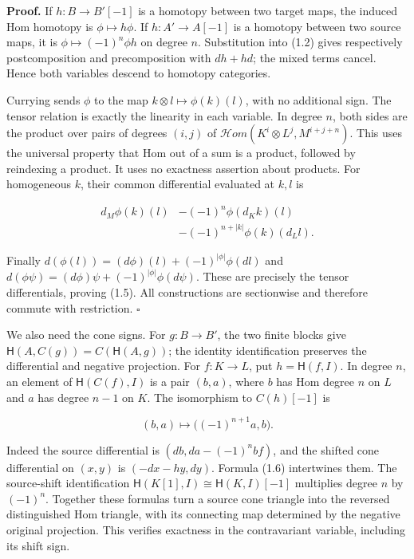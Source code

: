 \documentclass[
  english,
  11pt,
  a4paper,
]{article}
\begin{document}
\textbf{Proof.} If \(h:B\to B'[-1]\) is a homotopy between two target
maps, the induced Hom homotopy is \(\phi\mapsto h\phi\). If
\(h:A'\to A[-1]\) is a homotopy between two source maps, it is
\(\phi\mapsto(-1)^n\phi h\) on degree \(n\). Substitution into (1.2)
gives respectively postcomposition and precomposition with \(dh+hd\);
the mixed terms cancel. Hence both variables descend to homotopy
categories.

Currying sends \(\phi\) to the map \(k\otimes l\mapsto\phi(k)(l)\), with
no additional sign. The tensor relation is exactly the linearity in each
variable. In degree \(n\), both sides are the product over pairs of
degrees \((i,j)\) of \(\mathcal Hom(K^i\otimes L^j,M^{i+j+n})\). This
uses the universal property that Hom out of a sum is a product, followed
by reindexing a product. It uses no exactness assertion about products.
For homogeneous \(k\), their common differential evaluated at \(k,l\) is

\[\begin{aligned}
d_M\phi(k)(l)&-(-1)^n\phi(d_Kk)(l)\\
&-(-1)^{n+|k|}\phi(k)(d_Ll).
\end{aligned}\]

Finally \(d(\phi(l))=(d\phi)(l)+(-1)^{|\phi|}\phi(dl)\) and
\(d(\phi\psi)=(d\phi)\psi+(-1)^{|\phi|}\phi(d\psi)\). These are
precisely the tensor differentials, proving (1.5). All constructions are
sectionwise and therefore commute with restriction. \(\square\)

We also need the cone signs. For \(g:B\to B'\), the two finite blocks
give \(\mathsf H(A,C(g))=C(\mathsf H(A,g))\); the identity
identification preserves the differential and negative projection. For
\(f:K\to L\), put \(h=\mathsf H(f,I)\). In degree \(n\), an element of
\(\mathsf H(C(f),I)\) is a pair \((b,a)\), where \(b\) has Hom degree
\(n\) on \(L\) and \(a\) has degree \(n-1\) on \(K\). The isomorphism to
\(C(h)[-1]\) is

\[(b,a)\longmapsto\bigl((-1)^{n+1}a,b\bigr).
\tag{1.6}\]

Indeed the source differential is \((db,da-(-1)^nbf)\), and the shifted
cone differential on \((x,y)\) is \((-dx-hy,dy)\). Formula (1.6)
intertwines them. The source-shift identification
\(\mathsf H(K[1],I)\cong\mathsf H(K,I)[-1]\) multiplies degree \(n\) by
\((-1)^n\). Together these formulas turn a source cone triangle into the
reversed distinguished Hom triangle, with its connecting map determined
by the negative original projection. This verifies exactness in the
contravariant variable, including its shift sign.
\end{document}
